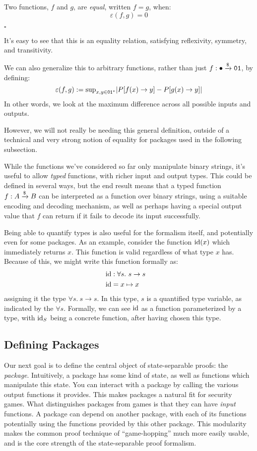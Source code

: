 \begin{definition}
    Two functions, $f$ and $g$, are \emph{equal}, written $f = g$, when:
    $$
    \varepsilon(f, g) = 0
    $$

    $\square$
\end{definition}

It's easy to see that this is an equality relation, satisfying
reflexivity, symmetry, and transitivity.

We can also generalize this to arbitrary functions, rather than just
$f : \bullet \xrightarrow{\$} \texttt{01}$, by defining:
$$
\varepsilon(f, g) := \text{sup}_{x, y \in \texttt{01}^*} |P[f(x) \to y] - P[g(x) \to y]|
$$
In other words, we look at the maximum difference
across all possible inputs and outputs.

However, we will not really be needing this general definition, outside
of a technical and very strong notion of equality for packages
used in the following subsection.

While the functions we've considered so far only manipulate binary strings,
it's useful to allow \emph{typed} functions,
with richer input and output types.
This could be defined in several ways, but the end result means
that a typed function $f : A \xrightarrow{\$} B$ can be interpreted as a function
over binary strings, using a suitable encoding and decoding mechanism,
as well as perhaps having a special output value that $f$ can return
if it fails to decode its input successfully.

Being able to quantify types is also useful for the formalism itself,
and potentially even for some packages.
As an example, consider the function $\text{id}(x)$ which immediately
returns $x$.
This function is valid regardless of what type $x$ has.
Because of this, we might write this function formally as:
$$
\begin{aligned}
    &\text{id} : \forall s.\ s \to s\cr
    &\text{id} = x \mapsto x
\end{aligned}
$$
assigning it the type $\forall s.\ s \to s$.
In this type, $s$ is a quantified type variable, as indicated by the $\forall s$.
Formally, we can see $\text{id}$ as a function parameterized by a type,
with $\text{id}_S$ being a concrete function, after having chosen this type.

\subsection{Defining Packages}

Our next goal is to define the central object of state-separable proofs:
the \emph{package}.
Intuitively, a package has some kind of state, as well as functions
which manipulate this state.
You can interact with a package by calling the various output functions
it provides.
This makes packages a natural fit for security games.
What distinguishes packages from games is that they can have \emph{input}
functions.
A package can depend on another package, with each of its functions
potentially using the functions provided by this other package.
This modularity makes the common proof technique of ``game-hopping''
much more easily usable, and is the core strength of the state-separable
proof formalism.

